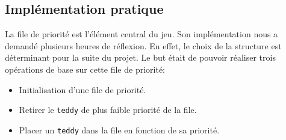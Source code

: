 \documentclass[12pt]{article}
\begin{document}
        \subsection{Implémentation pratique}
        La file de priorité est l'élément central du jeu. Son implémentation nous a demandé plusieurs heures de réflexion. En effet, le choix de la structure est déterminant pour la suite du projet. Le but était de pouvoir réaliser trois opérations de base sur cette file de priorité:
        \begin{itemize}
        \item Initialisation d'une file de priorité.
         \item Retirer le \texttt{teddy} de plus faible priorité de la file.
         \item Placer un \texttt{teddy} dans la file en fonction de sa priorité.\\


\end{itemize}
\end{document}
